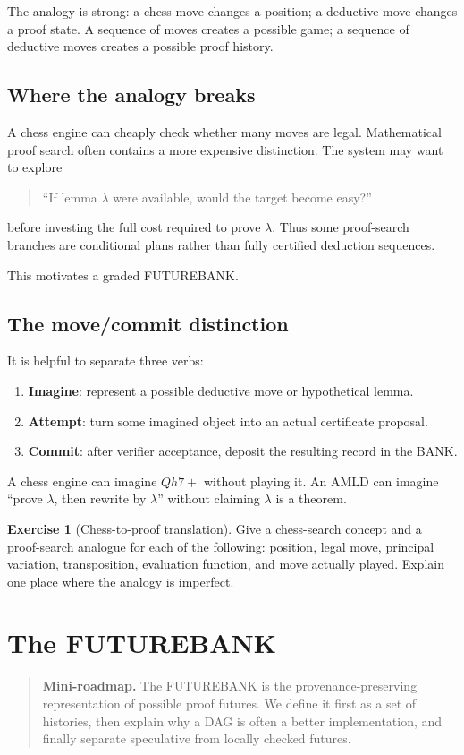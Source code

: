 \documentclass[11pt,openany]{book}
\theoremstyle{definition}
\newtheorem{exercise}[theorem]{Exercise}
\theoremstyle{remark}
\newenvironment{miniroadmap}{\begin{quote}\small\color{deepblue}\textbf{Mini-roadmap.} }{\end{quote}}
\begin{document}
The analogy is strong: a chess move changes a position; a deductive move changes a proof state. A sequence of moves creates a possible game; a sequence of deductive moves creates a possible proof history.

\section{Where the analogy breaks}
A chess engine can cheaply check whether many moves are legal. Mathematical proof search often contains a more expensive distinction. The system may want to explore
\begin{quote}
``If lemma $\lambda$ were available, would the target become easy?''
\end{quote}
before investing the full cost required to prove $\lambda$. Thus some proof-search branches are conditional plans rather than fully certified deduction sequences.

This motivates a graded FUTUREBANK.

\section{The move/commit distinction}
It is helpful to separate three verbs:
\begin{enumerate}
\item \textbf{Imagine}: represent a possible deductive move or hypothetical lemma.
\item \textbf{Attempt}: turn some imagined object into an actual certificate proposal.
\item \textbf{Commit}: after verifier acceptance, deposit the resulting record in the BANK.
\end{enumerate}
A chess engine can imagine $Qh7+$ without playing it. An AMLD can imagine ``prove $\lambda$, then rewrite by $\lambda$'' without claiming $\lambda$ is a theorem.

\begin{exercise}[Chess-to-proof translation]\label{ex:chess}
Give a chess-search concept and a proof-search analogue for each of the following: position, legal move, principal variation, transposition, evaluation function, and move actually played. Explain one place where the analogy is imperfect.
\end{exercise}

\chapter{The FUTUREBANK}
\begin{miniroadmap}
The FUTUREBANK is the provenance-preserving representation of possible proof futures. We define it first as a set of histories, then explain why a DAG is often a better implementation, and finally separate speculative from locally checked futures.
\end{miniroadmap}
\end{document}
